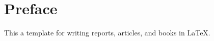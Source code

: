 
\chapter*{Preface}\label{ch:preface}

This a template for writing reports, articles, and books in \LaTeX.
